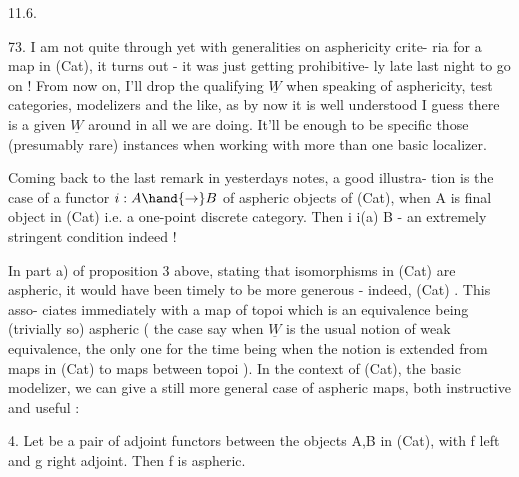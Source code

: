 
11.6.

73. I am not quite through yet with generalities on asphericity crite-%
ria for a map in (Cat), it turns out - it was just getting prohibitive-%
ly late last night to go on ! \margin{\P} From now on, I'll drop the qualifying
$\underline{W}$ when speaking of asphericity, test categories, modelizers and the
like, as by now it is well understood I guess there is a given $\underline{W}$ around
in all we are doing. It'll be enough to be specific  those (presumably
rare) instances when working with more than one basic localizer.

Coming back to the last remark in yesterdays notes, a good illustra-%
tion is the case of a functor $i : A \hand{\rightarrow} B$ of aspheric objects of (Cat),
when A is  final  object in (Cat) i.e. a one-point discrete
category. Then i \hand{\uline{\textcolor{black}{is aspheric iff}}} i(a) \hand{\uline{\textcolor{black}{is an initial object of}}} B - an
extremely stringent  condition indeed !

In part a) of proposition 3 above, stating that isomorphisms in
(Cat) are aspheric, it would have been timely to be more generous -
indeed, \hand{\uline{\textcolor{black}{any equivalence of categories in}}} (Cat) \hand{\uline{\textcolor{black}{is aspheric}}}. This asso-%
ciates immediately with a map of topoi which is an equivalence being
(trivially so) aspheric ( the case\hand{,} say\hand{,} when $\underline{W}$ is the usual notion of
weak equivalence, the only one for the time being when the notion is
extended from maps in (Cat) to maps between topoi ). In the context of
(Cat), the basic modelizer, we can give a still more general case of
aspheric maps, both instructive and useful :

\hand{\uline{\textcolor{black}{Proposition}}} 4. Let
be a pair of adjoint functors between the objects A,B in (Cat), with f
left and g right adjoint. Then f is aspheric.

